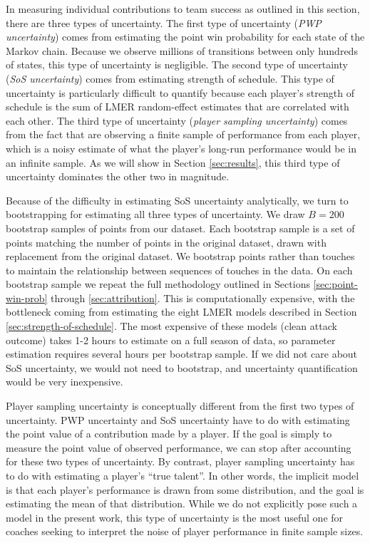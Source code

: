\documentclass[USenglish]{article}
\theoremstyle{dgthm}
\theoremstyle{dgdef}
\begin{document}
In measuring individual contributions to team success as outlined in this section, there are three types of uncertainty. The first type of uncertainty ({\it PWP uncertainty}) comes from estimating the point win probability for each state of the Markov chain. Because we observe millions of transitions between only hundreds of states, this type of uncertainty is negligible. The second type of uncertainty ({\it SoS uncertainty}) comes from estimating strength of schedule. This type of uncertainty is particularly difficult to quantify because each player's strength of schedule is the sum of LMER random-effect estimates that are correlated with each other. The third type of uncertainty ({\it player sampling uncertainty}) comes from the fact that are observing a finite sample of performance from each player, which is a noisy estimate of what the player's long-run performance would be in an infinite sample. As we will show in Section \ref{sec:results}, this third type of uncertainty dominates the other two in magnitude.

Because of the difficulty in estimating SoS uncertainty analytically, we turn to bootstrapping for estimating all three types of uncertainty. We draw $B = 200$ bootstrap samples of points from our dataset. Each bootstrap sample is a set of points matching the number of points in the original dataset, drawn with replacement from the original dataset. We bootstrap points rather than touches to maintain the relationship between sequences of touches in the data. On each bootstrap sample we repeat the full methodology outlined in Sections \ref{sec:point-win-prob} through \ref{sec:attribution}. This is computationally expensive, with the bottleneck coming from estimating the eight LMER models described in Section \ref{sec:strength-of-schedule}. The most expensive of these models (clean attack outcome) takes 1-2 hours to estimate on a full season of data, so parameter estimation requires several hours per bootstrap sample. If we did not care about SoS uncertainty, we would not need to bootstrap, and uncertainty quantification would be very inexpensive.

Player sampling uncertainty is conceptually different from the first two types of uncertainty. PWP uncertainty and SoS uncertainty have to do with estimating the point value of a contribution made by a player. If the goal is simply to measure the point value of observed performance, we can stop after accounting for these two types of uncertainty. By contrast, player sampling uncertainty has to do with estimating a player's ``true talent''. In other words, the implicit model is that each player's performance is drawn from some distribution, and the goal is estimating the mean of that distribution. While we do not explicitly pose such a model in the present work, this type of uncertainty is the most useful one for coaches seeking to interpret the noise of player performance in finite sample sizes.
\end{document}
